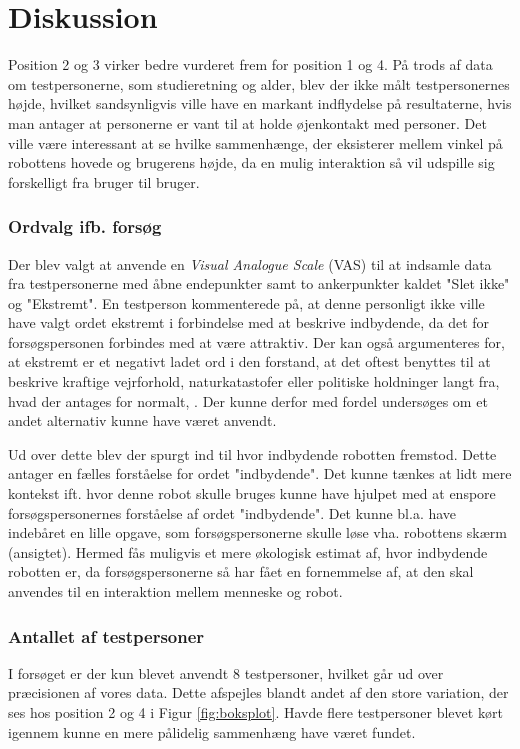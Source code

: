 \section*{Diskussion}
\label{Discussion}

Position 2 og 3 virker bedre vurderet frem for position 1 og 4. På trods af data om testpersonerne, som studieretning og alder, blev der ikke målt testpersonernes højde, hvilket sandsynligvis ville have en markant indflydelse på resultaterne, hvis man antager at personerne er vant til at holde øjenkontakt med personer. Det ville være interessant at se hvilke sammenhænge, der eksisterer mellem vinkel på robottens hovede og brugerens højde, da en mulig interaktion så vil udspille sig forskelligt fra bruger til bruger. 

\subsubsection{Ordvalg ifb. forsøg}
Der blev valgt at anvende en \textit{Visual Analogue Scale} (VAS) til at indsamle data fra testpersonerne med åbne endepunkter samt to ankerpunkter kaldet "Slet ikke" og "Ekstremt". En testperson kommenterede på, at denne personligt ikke ville have valgt ordet ekstremt i forbindelse med at beskrive indbydende, da det for forsøgspersonen forbindes med at være attraktiv. Der kan også argumenteres for, at ekstremt er et negativt ladet ord i den forstand, at det oftest benyttes til at beskrive kraftige vejrforhold, naturkatastofer eller politiske holdninger langt fra, hvad der antages for normalt, \parencite{Oxford2017}. Der kunne derfor med fordel undersøges om et andet alternativ kunne have været anvendt.

Ud over dette blev der spurgt ind til hvor indbydende robotten fremstod. Dette antager en fælles forståelse for ordet "indbydende". Det kunne tænkes at lidt mere kontekst ift. hvor denne robot skulle bruges kunne have hjulpet med at enspore forsøgspersonernes forståelse af ordet "indbydende". Det kunne bl.a. have indebåret en lille opgave, som forsøgspersonerne skulle løse vha. robottens skærm (ansigtet). Hermed fås muligvis et mere økologisk estimat af, hvor indbydende robotten er, da forsøgspersonerne så har fået en fornemmelse af, at den skal anvendes til en interaktion mellem menneske og robot.


\subsubsection{Antallet af testpersoner}
I forsøget er der kun blevet anvendt 8 testpersoner, hvilket går ud over præcisionen af vores data. Dette afspejles blandt andet af den store variation, der ses hos position 2 og 4 i Figur \ref{fig:boksplot}. Havde flere testpersoner blevet kørt igennem kunne en mere pålidelig sammenhæng have været fundet.
